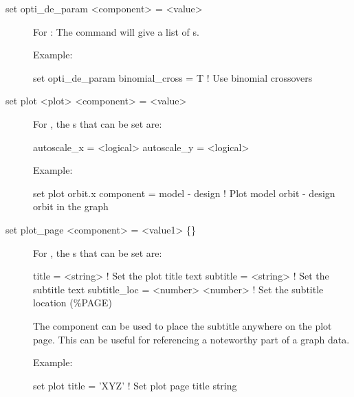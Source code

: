 {{\begin{description}

\item[set opti_de_param <component> = <value>] \Newline

\vskip -0.2in

For : The  command will give a list of 
s.

Example:
\begin{example}
  set opti_de_param binomial_cross = T  ! Use binomial crossovers 
\end{example}


\item[set plot <plot> <component> = <value>] \Newline

\vskip -0.2in

For , the s that can be set are:
\begin{example}
  autoscale_x = <logical>
  autoscale_y = <logical>
\end{example}

Example:
\begin{example}
  set plot orbit.x component = model - design  
                          ! Plot model orbit - design orbit in the graph
\end{example}


\item[set plot\_page <component> = <value1> \{<value2>\}] \Newline

\vskip -0.2in

For , the s that can be set are:
\begin{example}
  title        = <string>          ! Set the plot title text
  subtitle     = <string>          ! Set the subtitle text
  subtitle_loc = <number> <number> ! Set the subtitle location (\%PAGE)
\end{example}
The  component can be used to place the subtitle anywhere on
the plot page. This can be useful for referencing a noteworthy part of a graph
data.

Example:
\begin{example}
  set plot title = 'XYZ'  ! Set plot page title string
\end{example}


\end{description}}}
